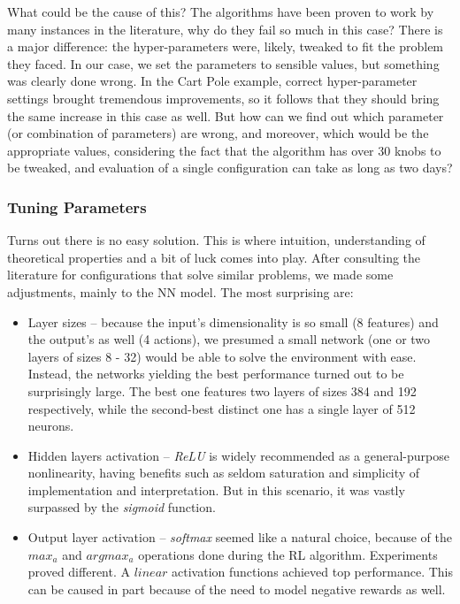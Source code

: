 \documentclass{article}
\begin{document}
 What could be the cause of this? The algorithms have been proven to work by many instances in the literature, why do they fail so much in this case? There is a major difference: the hyper-parameters were, likely, tweaked to fit the problem they faced. In our case, we set the parameters to sensible values, but something was clearly done wrong. In the Cart Pole example, correct hyper-parameter settings brought tremendous improvements, so it follows that they should bring the same increase in this case as well. But how can we find out which parameter (or combination of parameters) are wrong, and moreover, which would be the appropriate values, considering the fact that the algorithm has over 30 knobs to be tweaked, and evaluation of a single configuration can take as long as two days?
 
 
 \subsubsection{Tuning Parameters}
 
 Turns out there is no easy solution. This is where intuition, understanding of theoretical properties and a bit of luck comes into play. After consulting the literature for configurations that solve similar problems, we made some adjustments, mainly to the NN model. The most surprising are:
\begin{itemize}
  \item Layer sizes -- because the input's dimensionality is so small (8 features) and the output's as well (4 actions), we presumed a small network (one or two layers of sizes 8 - 32) would be able to solve the environment with ease. Instead, the networks yielding the best performance turned out to be surprisingly large. The best one features two layers of sizes 384 and 192 respectively, while the second-best distinct one has a single layer of 512 neurons.
  \item Hidden layers activation -- \textit{ReLU} is widely recommended as a general-purpose nonlinearity, having benefits such as seldom saturation and simplicity of implementation and interpretation. But in this scenario, it was vastly surpassed by the \textit{sigmoid} function. 
  \item Output layer activation -- \textit{softmax} seemed like a natural choice, because of the $max_a$ and $argmax_a$ operations done during the RL algorithm. Experiments proved different. A $linear$ activation functions achieved top performance. This can be caused in part because of the need to model negative rewards as well.
\end{itemize}
 
\end{document}
